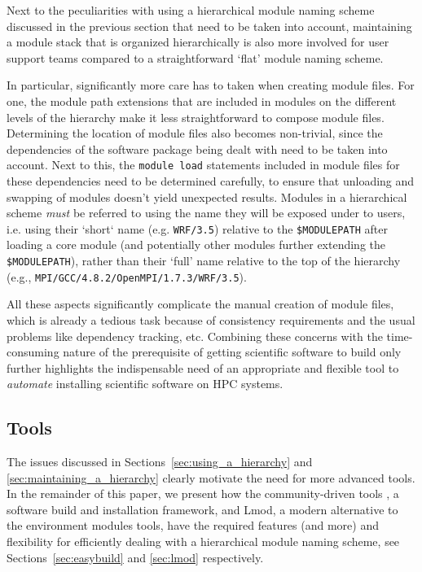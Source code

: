 Next to the peculiarities with using a hierarchical module naming scheme discussed in
the previous section that need to be taken into account, maintaining a module stack
that is organized hierarchically is also more involved for user support teams
compared to a straightforward `flat' module naming scheme.

In particular, significantly more care has to taken when creating
module files. For one, the module path extensions that are included in modules
on the different levels of the hierarchy make it less straightforward to compose
module files. Determining the location of module files also becomes
non-trivial, since the dependencies of the software package being dealt with need
to be taken into account. Next to this, the \texttt{module load} statements included
in module files for these dependencies need to be determined carefully, to ensure
that unloading and swapping of modules doesn't yield unexpected results. Modules
in a hierarchical scheme \emph{must} be referred to using the name they will be
exposed under to users, i.e. using their `short` name (e.g. \texttt{WRF/3.5})
relative to the \texttt{\$MODULEPATH} after loading a core module (and potentially
other modules further extending the \texttt{\$MODULEPATH}), rather than their `full'
name relative to the top of the hierarchy (e.g.,
\texttt{MPI/GCC/4.8.2/OpenMPI/1.7.3/WRF/3.5}).

All these aspects significantly complicate the manual creation of module files, which
is already a tedious task because of consistency requirements and the usual problems
like dependency tracking, etc. Combining these concerns with the time-consuming
nature of the prerequisite of getting scientific software to build only further
highlights the indispensable need of an appropriate and flexible tool to
\emph{automate} installing scientific software on HPC systems.

\subsection{Tools}
\label{sec:tools_for_hierarchical}

The issues discussed in Sections~\ref{sec:using_a_hierarchy} and
\ref{sec:maintaining_a_hierarchy} clearly motivate the need for more advanced tools.
In the remainder of this paper, we present how the community-driven tools
\easybuild{}, a software build and installation framework, and Lmod, a modern
alternative to the environment modules tools, have the required features (and more)
and flexibility for efficiently dealing with a hierarchical module naming scheme,
see Sections~\ref{sec:easybuild} and \ref{sec:lmod} respectively.
